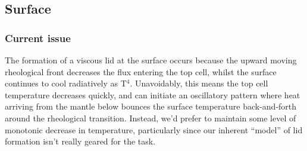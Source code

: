 \subsection{Surface}
\subsubsection{Current issue}
The formation of a viscous lid at the surface occurs because the upward moving rheological front decreases the flux entering the top cell, whilst the surface continues to cool radiatively as T$^4$.  Unavoidably, this means the top cell temperature decreases quickly, and can initiate an oscillatory pattern where heat arriving from the mantle below bounces the surface temperature back-and-forth around the rheological transition.  Instead, we'd prefer to maintain some level of monotonic decrease in temperature, particularly since our inherent ``model'' of lid formation isn't really geared for the task.
